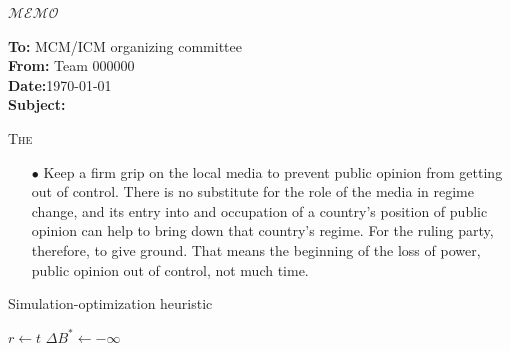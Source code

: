 \documentclass[12pt]{article}  %
\begin{document}
\begin{letter}{\huge{$\mathscr{MEMO}$}}
\begin{flushleft}  %
\textbf{To:} MCM/ICM organizing committee\\
\textbf{From:} Team 000000\\
\textbf{Date:}\today\\
\textbf{Subject:} 
\end{flushleft}
\lettrine{T}{he}
{\itshape \begin{enumerate}[0]
    \item[$\bullet$] Keep a firm grip on the local media to prevent public opinion from getting out of control. There is no substitute for the role of the media in regime change, and its entry into and occupation of a country's position of public opinion can help to bring down that country's regime. For the ruling party, therefore, to give ground. That means the beginning of the loss of power, public opinion out of control, not much time.
\end{enumerate}}
\end{letter}
\begin{algorithm}
\caption{Simulation-optimization heuristic}\label{algorithm}
$r\leftarrow t$\;
$\Delta B^{\ast}\leftarrow -\infty$\;
\end{algorithm}
\end{document}
